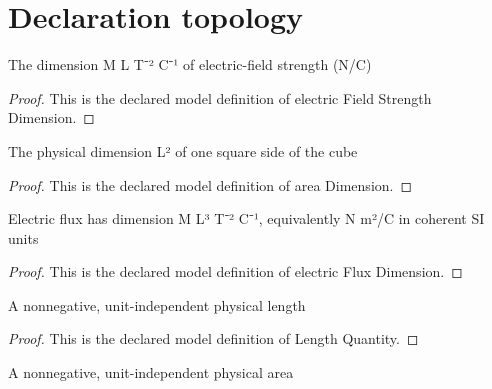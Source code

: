 \section{Declaration topology}
\begin{definition}
  \label{def:physics:phyx-mini-0850:phyxminiproblems-problemphyxmini0850-electricfieldstrengthdimension}
  The dimension M L T⁻² C⁻¹ of electric-field strength (N/C)
\end{definition}
\begin{proof}
  This is the declared model definition of electric Field Strength Dimension.
\end{proof}
\begin{definition}
  \label{def:physics:phyx-mini-0850:phyxminiproblems-problemphyxmini0850-areadimension}
  The physical dimension L² of one square side of the cube
\end{definition}
\begin{proof}
  This is the declared model definition of area Dimension.
\end{proof}
\begin{definition}
  \label{def:physics:phyx-mini-0850:phyxminiproblems-problemphyxmini0850-electricfluxdimension}
  Electric flux has dimension M L³ T⁻² C⁻¹, equivalently N m²/C in coherent SI units
\end{definition}
\begin{proof}
  This is the declared model definition of electric Flux Dimension.
\end{proof}
\begin{definition}
  \label{def:physics:phyx-mini-0850:phyxminiproblems-problemphyxmini0850-lengthquantity}
  A nonnegative, unit-independent physical length
\end{definition}
\begin{proof}
  This is the declared model definition of Length Quantity.
\end{proof}
\begin{definition}
  \label{def:physics:phyx-mini-0850:phyxminiproblems-problemphyxmini0850-areaquantity}
  A nonnegative, unit-independent physical area
\end{definition}
